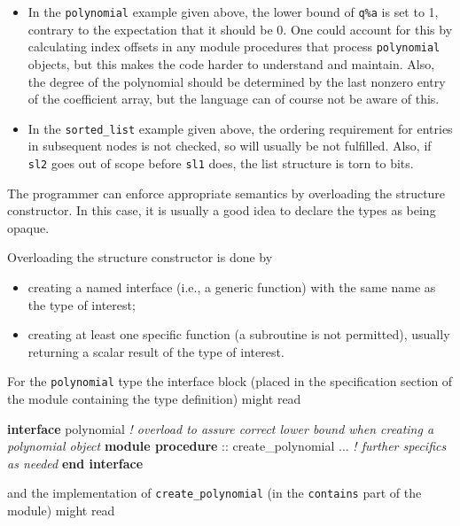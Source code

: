 \documentclass[
  paper=a4,
  ,captions=tableheading
]{scrartcl}
\newenvironment{Shaded}{\begin{snugshade}}{\end{snugshade}}
\newcommand{\CommentTok}[1]{\textcolor[rgb]{0.56,0.35,0.01}{\textit{#1}}}
\newcommand{\DataTypeTok}[1]{\textcolor[rgb]{0.13,0.29,0.53}{#1}}
\newcommand{\KeywordTok}[1]{\textcolor[rgb]{0.13,0.29,0.53}{\textbf{#1}}}
\newcommand{\NormalTok}[1]{#1}
\providecommand{\tightlist}{%
  \setlength{\itemsep}{0pt}\setlength{\parskip}{0pt}}
\begin{document}
\begin{itemize}
\tightlist
\item
  In the \texttt{polynomial} example given above, the lower bound of
  \texttt{q\%a} is set to 1, contrary to the expectation that it should
  be 0. One could account for this by calculating index offsets in any
  module procedures that process \texttt{polynomial} objects, but this
  makes the code harder to understand and maintain. Also, the degree of
  the polynomial should be determined by the last nonzero entry of the
  coefficient array, but the language can of course not be aware of
  this.
\item
  In the \texttt{sorted\_list} example given above, the ordering
  requirement for entries in subsequent nodes is not checked, so will
  usually be not fulfilled. Also, if \texttt{sl2} goes out of scope
  before \texttt{sl1} does, the list structure is torn to bits.
\end{itemize}

The programmer can enforce appropriate semantics by overloading the
structure constructor. In this case, it is usually a good idea to
declare the types as being opaque.

Overloading the structure constructor is done by

\begin{itemize}
\tightlist
\item
  creating a named interface (i.e., a generic function) with the same
  name as the type of interest;
\item
  creating at least one specific function (a subroutine is not
  permitted), usually returning a scalar result of the type of interest.
\end{itemize}

For the \texttt{polynomial} type the interface block (placed in the
specification section of the module containing the type definition)
might read

\begin{Shaded}
\begin{Highlighting}[]
\KeywordTok{interface}\NormalTok{ polynomial}
\CommentTok{! overload to assure correct lower bound when creating a polynomial object}
  \KeywordTok{module procedure} \DataTypeTok{::}\NormalTok{ create\_polynomial}
\NormalTok{  ... }\CommentTok{! further specifics as needed}
\KeywordTok{end interface}
\end{Highlighting}
\end{Shaded}

and the implementation of \texttt{create\_polynomial} (in the
\texttt{contains} part of the module) might read
\end{document}
